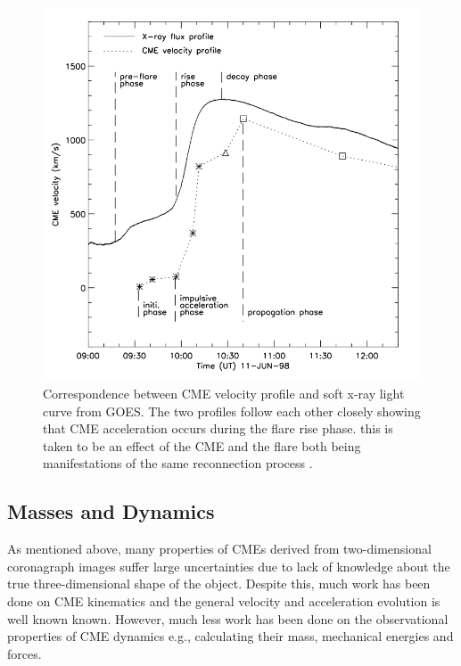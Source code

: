 \begin{figure}[t!]
\begin{center}
\includegraphics[scale=0.4]{images/zhang2001}
\caption{Correspondence between CME velocity profile and soft x-ray light curve from GOES. The two profiles follow each other closely showing that CME acceleration occurs during the flare rise phase. this is taken to be an effect of the CME and the flare both being manifestations of the same reconnection process \citet{zhang2001}.}
\end{center}
\label{fig:zhang2001}
\end{figure}

\subsection{Masses and Dynamics}

As mentioned above, many properties of CMEs derived from two-dimensional coronagraph images suffer large uncertainties due to lack of knowledge about the true three-dimensional shape of the object. Despite this, much work has been done on CME kinematics and the general velocity and acceleration evolution is well known known. However, much less work has been done on the observational properties of CME dynamics e.g., calculating their mass, mechanical energies and forces. 

